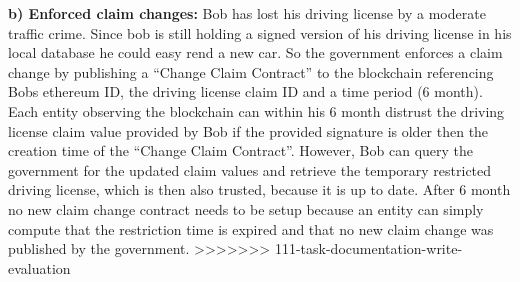 \textbf{b) Enforced claim changes:}
Bob has lost his driving license by a moderate traffic crime. Since bob is still holding a signed version of his driving license in his local database he could easy rend a new car. So the government enforces a claim change by publishing a “Change Claim Contract” to the blockchain referencing Bobs ethereum ID, the driving license claim ID and a time period (6 month). Each entity observing the blockchain can within his 6 month distrust the driving license claim value provided by Bob if the provided signature is older then the creation time of the “Change Claim Contract”. However, Bob can query the government for the updated claim values and retrieve the temporary restricted driving license, which is then also trusted, because it is up to date. After 6 month no new claim change contract needs to be setup because an entity can simply compute that the restriction time is expired and that no new claim change was published by the government. 
>>>>>>> 111-task-documentation-write-evaluation
